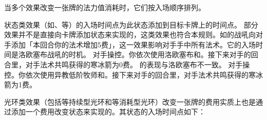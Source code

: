 当多个效果改变一张牌的法力值消耗时，它们按入场顺序排列。

状态类效果（如、等）的入场时间点为此状态添加到目标卡牌上的时间点。
\notice 部分效果并不是直接向卡牌添加状态来实现的，这类效果也符合本规则。如的战吼向对手添加「本回合你的法术增加5费」，这一效果影响对手手中所有法术。它的入场时间是洛欧塞布战吼的时机。
\example 对手操控。你依次使用洛欧塞布和。接下来对手的回合里，对手法术共鸣获得的寒冰箭为0费。
\exception {}的表现与洛欧塞布不一致。
\example 对手操控。你依次使用异教低阶牧师和。接下来对手的回合里，对手法术共鸣获得的寒冰箭为1费。

光环类效果（包括等持续型光环和等消耗型光环）改变一张牌的费用实质上也是通过添加一个费用改变状态来实现的。其状态的入场时间点如下：
